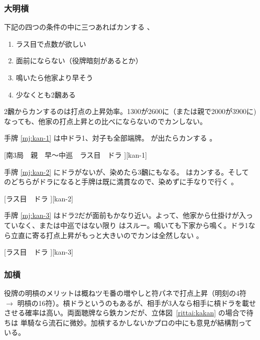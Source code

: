\documentclass[../nankiru_main.tex]{subfiles}
\begin{document}
\subsubsection*{大明槓}

下記の四つの条件の中に三つあればカンする \citep[][p.~140]{kawamura-naki}、

\begin{enumerate}
\item ラス目で点数が欲しい
\item 面前にならない（役牌暗刻があるとか）
\item 鳴いたら他家より早そう
\item 少なくとも2飜ある
\end{enumerate}

2飜からカンするのは打点の上昇効率。1300が2600に（または親で2000が3900に)なっても、他家の打点上昇との比べにならないのでカンしない。

手牌 \ref{mj:kan-1} は中ドラ1、対子も全部端牌。 が出たらカンする \citep[][pp.~139--140]{kawamura-naki}。

[南3局　親　早〜中巡　ラス目　ドラ ][kan-1]

手牌 \ref{mj:kan-2} にドラがないが、染めたら3飜にもなる。 はカンする。そして  のどちらがドラになると手牌は既に満貫なので、染めずに手なりで行く \citep[][pp.~141--142]{kawamura-naki}。

[ラス目　ドラ ][kan-2]

手牌 \ref{mj:kan-3} はドラ2だが面前もかなり近い。よって、他家から仕掛けが入っていなく、または中巡ではない限り  はスルー。鳴いても下家から鳴く。ドラ1なら立直に寄る打点上昇がもっと大きいのでカンは全然しない \citep[][pp.~141--142]{kawamura-naki}。

[ラス目　ドラ ][kan-3]


\subsubsection*{加槓}

役牌の明槓のメリットは概ねツモ番の増やしと符パネで打点上昇（明刻の4符 $\to$ 明槓の16符）。槓ドラというのもあるが、相手が3人なら相手に槓ドラを載せさせる確率は高い。両面聴牌なら鉄カンだが、立体図~\ref{rittai:kakan} の場合で待ちは  単騎なら流石に微妙。加槓するかしないかプロの中にも意見が結構割っている\citep[][pp.~198--199, p.~222]{fkt}。

\begin{rittai}[h]
  \centering
  \caption{}
  \label{rittai:kakan}
\end{rittai}
\end{document}
